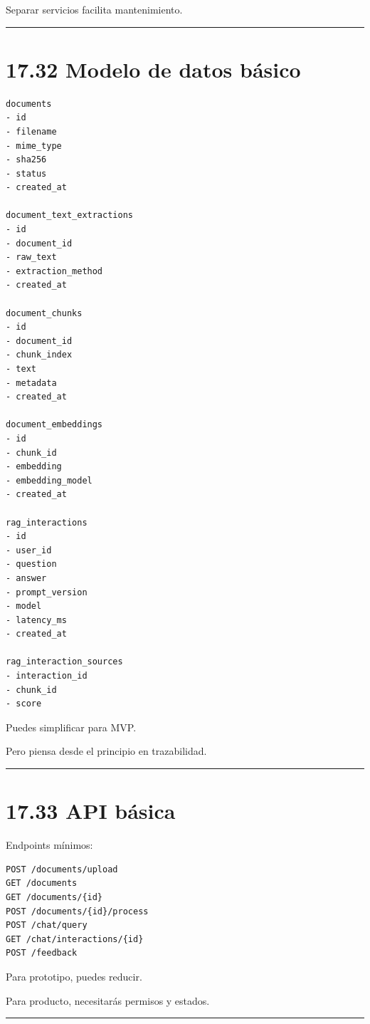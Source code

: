 Separar servicios facilita mantenimiento.

\begin{center}\rule{0.5\linewidth}{0.5pt}\end{center}

\section{17.32 Modelo de datos básico}\label{modelo-de-datos-buxe1sico}

\begin{lstlisting}
documents
- id
- filename
- mime_type
- sha256
- status
- created_at

document_text_extractions
- id
- document_id
- raw_text
- extraction_method
- created_at

document_chunks
- id
- document_id
- chunk_index
- text
- metadata
- created_at

document_embeddings
- id
- chunk_id
- embedding
- embedding_model
- created_at

rag_interactions
- id
- user_id
- question
- answer
- prompt_version
- model
- latency_ms
- created_at

rag_interaction_sources
- interaction_id
- chunk_id
- score
\end{lstlisting}

Puedes simplificar para MVP.

Pero piensa desde el principio en trazabilidad.

\begin{center}\rule{0.5\linewidth}{0.5pt}\end{center}

\section{17.33 API básica}\label{api-buxe1sica}

Endpoints mínimos:

\begin{lstlisting}
POST /documents/upload
GET /documents
GET /documents/{id}
POST /documents/{id}/process
POST /chat/query
GET /chat/interactions/{id}
POST /feedback
\end{lstlisting}

Para prototipo, puedes reducir.

Para producto, necesitarás permisos y estados.

\begin{center}\rule{0.5\linewidth}{0.5pt}\end{center}

